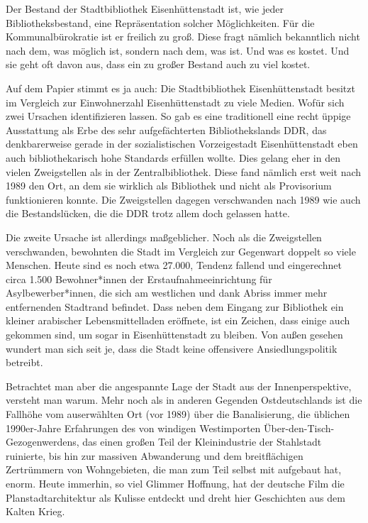 \documentclass[a4paper,
fontsize=11pt,
oneside,
numbers=noperiodatend,
parskip=half-,
bibliography=totoc,
final
]{scrartcl}
\begin{document}
Der Bestand der Stadtbibliothek Eisenhüttenstadt ist, wie jeder
Bibliotheksbestand, eine Repräsentation solcher Möglichkeiten. Für die
Kommunalbürokratie ist er freilich zu groß. Diese fragt nämlich
bekanntlich nicht nach dem, was möglich ist, sondern nach dem, was ist.
Und was es kostet. Und sie geht oft davon aus, dass ein zu großer
Bestand auch zu viel kostet.

Auf dem Papier stimmt es ja auch: Die Stadtbibliothek Eisenhüttenstadt
besitzt im Vergleich zur Einwohnerzahl Eisenhüttenstadt zu viele Medien.
Wofür sich zwei Ursachen identifizieren lassen. So gab es eine
traditionell eine recht üppige Ausstattung als Erbe des sehr
aufgefächterten Bibliothekslands DDR, das denkbarerweise gerade in der
sozialistischen Vorzeigestadt Eisenhüttenstadt eben auch
bibliothekarisch hohe Standards erfüllen wollte. Dies gelang eher in den
vielen Zweigstellen als in der Zentralbibliothek. Diese fand nämlich
erst weit nach 1989 den Ort, an dem sie wirklich als Bibliothek und
nicht als Provisorium funktionieren konnte. Die Zweigstellen dagegen
verschwanden nach 1989 wie auch die Bestandslücken, die die DDR trotz
allem doch gelassen hatte.

Die zweite Ursache ist allerdings maßgeblicher. Noch als die
Zweigstellen verschwanden, bewohnten die Stadt im Vergleich zur
Gegenwart doppelt so viele Menschen. Heute sind es noch etwa 27.000,
Tendenz fallend und eingerechnet circa 1.500 Bewohner*innen der
Erstaufnahmeeinrichtung für Asylbewerber*innen, die sich am westlichen
und dank Abriss immer mehr entfernenden Stadtrand befindet. Dass neben
dem Eingang zur Bibliothek ein kleiner arabischer Lebensmittelladen
eröffnete, ist ein Zeichen, dass einige auch gekommen sind, um sogar in
Eisenhüttenstadt zu bleiben. Von außen gesehen wundert man sich seit je,
dass die Stadt keine offensivere Ansiedlungspolitik betreibt.

Betrachtet man aber die angespannte Lage der Stadt aus der
Innenperspektive, versteht man warum. Mehr noch als in anderen Gegenden
Ostdeutschlands ist die Fallhöhe vom auserwählten Ort (vor 1989) über
die Banalisierung, die üblichen 1990er-Jahre Erfahrungen des von
windigen Westimporten Über-den-Tisch-Gezogenwerdens, das einen großen
Teil der Kleinindustrie der Stahlstadt ruinierte, bis hin zur massiven
Abwanderung und dem breitflächigen Zertrümmern von Wohngebieten, die man
zum Teil selbst mit aufgebaut hat, enorm. Heute immerhin, so viel
Glimmer Hoffnung, hat der deutsche Film die Planstadtarchitektur als
Kulisse entdeckt und dreht hier Geschichten aus dem Kalten Krieg.
\end{document}
